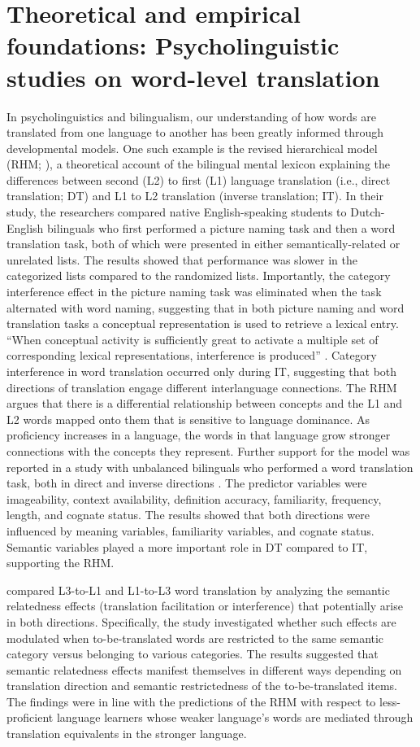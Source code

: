 \documentclass[output=paper]{langscibook}
\begin{document}
\section{Theoretical and empirical foundations: Psycholinguistic studies on word-level translation}
In psycholinguistics and bilingualism, our understanding of how words are translated from one language to another has been greatly informed through developmental models. One such example is the revised hierarchical model (RHM; \citealt{kroll1994category}), a theoretical account of the bilingual mental lexicon explaining the differences between second (L2) to first (L1) language translation (i.e., direct translation; DT) and L1 to L2 translation (inverse translation; IT). In their study, the researchers compared native English-speaking students to Dutch-English bilinguals who first performed a picture naming task and then a word translation task, both of which were presented in either semantically-related or unrelated lists. The results showed that performance was slower in the categorized lists compared to the randomized lists. Importantly, the category interference effect in the picture naming task was eliminated when the task alternated with word naming, suggesting that in both picture naming and word translation tasks a conceptual representation is used to retrieve a lexical entry. “When conceptual activity is sufficiently great to activate a multiple set of corresponding lexical representations, interference is produced” \citep[149]{kroll1994category}. Category interference in word translation occurred only during IT, suggesting that both directions of translation engage different interlanguage connections. The RHM argues that there is a differential relationship between concepts and the L1 and L2 words mapped onto them that is sensitive to language dominance. As proficiency increases in a language, the words in that language grow stronger connections with the concepts they represent. Further support for the model was reported in a study with unbalanced bilinguals who performed a word translation task, both in direct and inverse directions \citep{annette1994forward}. The predictor variables were imageability, context availability, definition accuracy, familiarity, frequency, length, and cognate status. The results showed that both directions were influenced by meaning variables, familiarity variables, and cognate status. Semantic variables played a more important role in DT compared to IT, supporting the RHM.

\citet{ferreira2014underlying} compared L3-to-L1 and L1-to-L3 word translation by analyzing the semantic relatedness effects (translation facilitation or interference) that potentially arise in both directions. Specifically, the study investigated whether such effects are modulated when to-be-translated words are restricted to the same semantic category versus belonging to various categories. The results suggested that semantic relatedness effects manifest themselves in different ways depending on translation direction and semantic restrictedness of the to-be-translated items. The findings were in line with the predictions of the RHM with respect to less-proficient language learners whose weaker language’s words are mediated through translation equivalents in the stronger language.
\end{document}
